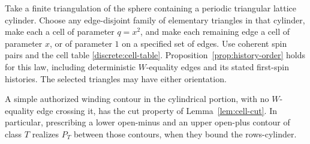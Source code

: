 \begin{lemma}\label{annulus:ambient}
Take a finite triangulation of the sphere containing a periodic triangular
lattice cylinder. Choose any edge-disjoint family of elementary triangles
in that cylinder, make each a cell of parameter $q=x^2$, and make each
remaining edge a cell of parameter $x$, or of parameter $1$ on a specified
set of edges. Use coherent spin pairs and the cell table
\eqref{discrete:cell-table}. Proposition~\ref{prop:history-order} holds
for this law, including deterministic $W$-equality edges and its stated
first-spin histories. The selected triangles may have either orientation.

A simple authorized winding contour in the cylindrical portion, with no
$W$-equality edge crossing it, has the cut property of
Lemma~\ref{lem:cell-cut}. In particular, prescribing a
lower open-minus and an upper open-plus contour of class $T$ realizes
$P_T$ between those contours, when they bound the rows-cylinder.
\end{lemma}
